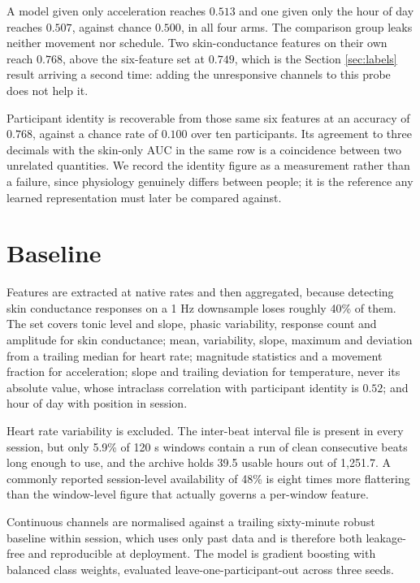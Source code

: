 \documentclass{article}
\begin{document}
A model given only acceleration reaches $0.513$ and one given only the hour of
day reaches $0.507$, against chance $0.500$, in all four arms. The comparison
group leaks neither movement nor schedule. Two skin-conductance features on
their own reach $0.768$, above the six-feature set at $0.749$, which is the
Section \ref{sec:labels} result arriving a second time: adding the unresponsive
channels to this probe does not help it.

Participant identity is recoverable from those same six features at an accuracy
of $0.768$, against a chance rate of $0.100$ over ten participants. Its
agreement to three decimals with the skin-only AUC in the same row is a
coincidence between two unrelated quantities. We record the identity figure as
a measurement rather than a failure, since physiology genuinely differs between
people; it is the reference any learned representation must later be compared
against.

\section{Baseline}
\label{sec:baseline}

Features are extracted at native rates and then aggregated, because detecting
skin conductance responses on a 1 Hz downsample loses roughly 40\% of them. The
set covers tonic level and slope, phasic variability, response count and
amplitude for skin conductance; mean, variability, slope, maximum and deviation
from a trailing median for heart rate; magnitude statistics and a movement
fraction for acceleration; slope and trailing deviation for temperature, never
its absolute value, whose intraclass correlation with participant identity is
$0.52$; and hour of day with position in session.

Heart rate variability is excluded. The inter-beat interval file is present in
every session, but only 5.9\% of 120 s windows contain a run of clean
consecutive beats long enough to use, and the archive holds 39.5 usable hours
out of 1{,}251.7. A commonly reported session-level availability of 48\% is
eight times more flattering than the window-level figure that actually governs
a per-window feature.

Continuous channels are normalised against a trailing sixty-minute robust
baseline within session, which uses only past data and is therefore both
leakage-free and reproducible at deployment. The model is gradient boosting
with balanced class weights, evaluated leave-one-participant-out across three
seeds.
\end{document}
